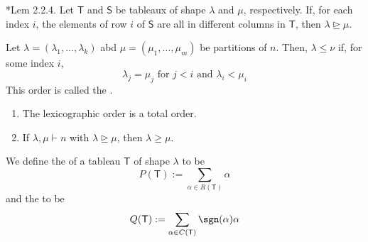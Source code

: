 \documentclass[11pt,leqno,oneside]{amsbook}
\newcommand{\partitionof}{\vdash}
\newcommand{\T}{\mathsf{T}} %
\renewcommand{\S}{\mathsf{S}}
\newcommand{\dominates}{\trianglerighteq}
\newcommand{\lexicoleq}{\leq}
\newcommand{\lexicogeq}{\geq}
\numberwithin{thm}{section}
\begin{document}
\begin{lem}
  \cite{sagan}*{Lem 2.2.4}. Let \(\T\) and \(\S\) be tableaux of shape
  \(\lambda\) and \(\mu\), 
  respectively. If, for each index \(i\), the elements of row \(i\) of
  \(\S\) are all in different columns in \(\T\), then \(\lambda
  \dominates \mu\).
\end{lem}
\begin{defn}
  Let \(\lambda = (\lambda_1, \ldots, \lambda_k)\) abd \(\mu=(\mu_1,
  \ldots, \mu_m)\) be partitions of \(n\). Then, \(\lambda \lexicoleq
  \nu\) if, for some index \(i\), \[
    \lambda_j = \mu_j \text{ for }j<i\text{ and }\lambda_i < \mu_i
  \]
  This order is called the .
\end{defn}
\begin{prop}
  \begin{enumerate}
  \item The lexicographic order is a total order.
  \item If \(\lambda,\mu \partitionof n\) with \(\lambda \dominates
    \mu\), then \(\lambda \lexicogeq \mu\).
  \end{enumerate}
\end{prop}
\begin{defn}
  We define the  of a tableau \(\T\) of shape
  \(\lambda\) to be \[
    P(\T) := \sum_{\alpha \in R(\T)} \alpha
  \]
  and the  to be \[
    Q(\T) := \sum_{\alpha \in C(\T)} \sgn(\alpha) \alpha
  \]
\end{defn}
\end{document}
